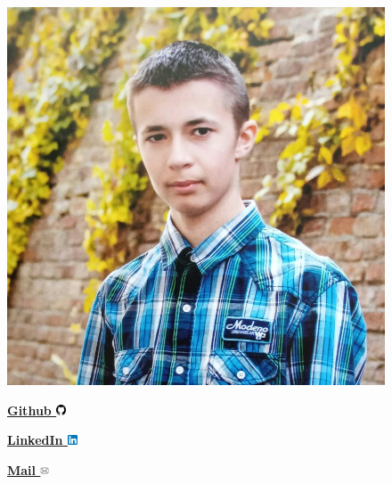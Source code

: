 \hypersetup{
    urlbordercolor=white
}


\begin{figure}
    \begin{flushright}
        \includegraphics[width=0.2\linewidth]{images/profile.jpeg}

        {
            
            \vspace{0.2cm}
            \textbf{
                {\href{https://github.com/LostHopes}{Github \includegraphics[width=0.30cm]{images/github.png}}}
            }

            \vspace{0.2cm}
            \textbf{
                {\href{https://www.linkedin.com/in/arsen-melnychuk-840b5126b/}{LinkedIn \includegraphics[width=0.30cm]{images/linkedin.png}}}
            }

            \vspace{0.2cm}
            \textbf{
                {\href{mailto:arsen.melnuchyk@gmail.com}{Mail \includegraphics[width=0.25cm]{images/mail.png}}}
            }

        }
    \end{flushright}
\end{figure}
